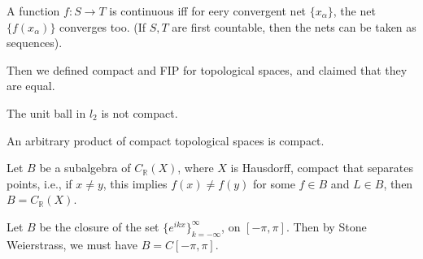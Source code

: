 \documentclass[openany]{book}
\newcommand{\R}{\mathbb{R}}
\begin{document}
\begin{prop}
    A function $f: S\to T$ is continuous iff for eery convergent net $\{x_\alpha\}$, the net $\{f(x_\alpha)\}$ converges too. (If $S,T$ are first countable, then the nets can be taken as sequences).
\end{prop}
Then we defined compact and FIP for topological spaces, and claimed that they are equal.

\begin{example}
    The unit ball in $l_2$ is not compact.
\end{example}

\begin{prop}[Tychnoff]
    An arbitrary product of compact topological spaces is compact.
\end{prop}

\begin{prop}
    Let $B$ be a subalgebra of $C_\R(X)$, where $X$ is Hausdorff, compact that separates points, i.e., if $x\neq y$, this implies $f(x)\neq f(y)$ for some $f\in B$ and $L\in B$, then $B=C_\R(X)$.
\end{prop}




\begin{example}
    Let $B$ be the closure of the set $\{e^{ikx}\}_{k=-\infty}^\infty$, on $[-\pi,\pi]$. Then by Stone Weierstrass, we must have $B=C[-\pi,\pi]$.
\end{example}




\end{document}
